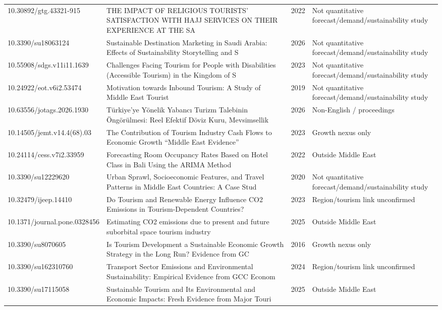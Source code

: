 \begin{longtable}{@{}p{3.6cm}p{7.3cm}p{0.8cm}p{3.4cm}@{}}
10.30892/gtg.43321-915 & THE IMPACT OF RELIGIOUS TOURISTS’ SATISFACTION WITH HAJJ SERVICES ON THEIR EXPERIENCE AT THE SA & 2022 & Not quantitative forecast/demand/sustainability study \\
10.3390/su18063124 & Sustainable Destination Marketing in Saudi Arabia: Effects of Sustainability Storytelling and S & 2026 & Not quantitative forecast/demand/sustainability study \\
10.55908/sdgs.v11i11.1639 & Challenges Facing Tourism for People with Disabilities (Accessible Tourism) in the Kingdom of S & 2023 & Not quantitative forecast/demand/sustainability study \\
10.24922/eot.v6i2.53474 & Motivation towards Inbound Tourism: A Study of Middle East Tourist & 2019 & Not quantitative forecast/demand/sustainability study \\
10.63556/jotags.2026.1930 & Türkiye'ye Yönelik Yabancı Turizm Talebinin Öngörülmesi: Reel Efektif Döviz Kuru, Mevsimsellik  & 2026 & Non-English / proceedings \\
10.14505/jemt.v14.4(68).03 & The Contribution of Tourism Industry Cash Flows to Economic Growth “Middle East Evidence” & 2023 & Growth nexus only \\
10.24114/cess.v7i2.33959 & Forecasting Room Occupancy Rates Based on Hotel Class in Bali Using the ARIMA Method & 2022 & Outside Middle East \\
10.3390/su12229620 & Urban Sprawl, Socioeconomic Features, and Travel Patterns in Middle East Countries: A Case Stud & 2020 & Not quantitative forecast/demand/sustainability study \\
10.32479/ijeep.14410 & Do Tourism and Renewable Energy Influence CO2 Emissions in Tourism-Dependent Countries? & 2023 & Region/tourism link unconfirmed \\
10.1371/journal.pone.0328456 & Estimating CO2 emissions due to present and future suborbital space tourism industry & 2025 & Outside Middle East \\
10.3390/su8070605 & Is Tourism Development a Sustainable Economic Growth Strategy in the Long Run? Evidence from GC & 2016 & Growth nexus only \\
10.3390/su162310760 & Transport Sector Emissions and Environmental Sustainability: Empirical Evidence from GCC Econom & 2024 & Region/tourism link unconfirmed \\
10.3390/su17115058 & Sustainable Tourism and Its Environmental and Economic Impacts: Fresh Evidence from Major Touri & 2025 & Outside Middle East \\

\end{longtable}

